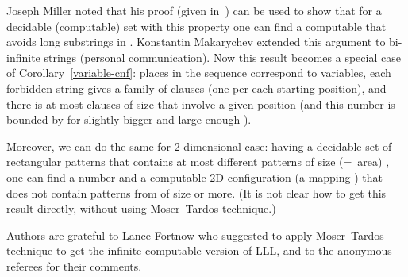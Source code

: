 \documentclass[12pt]{article}
\begin{document}
Joseph Miller noted that his proof (given in~\cite{miller-two-notes}) can be used to show that for a decidable (computable) set  with this property one can find a computable  that avoids long substrings in . Konstantin Makarychev extended this argument to bi-infinite strings (personal communication). Now this result becomes a special case of Corollary~\ref{variable-cnf}: places in the sequence correspond to variables, each forbidden string gives a family of clauses (one per each starting position), and there is at most  clauses of size  that involve a given position (and this number is bounded by  for slightly bigger  and large enough ).

Moreover, we can do the same for 2-dimensional case: having a decidable
set  of rectangular patterns that contains at most  different
patterns of size (=~area) , one can find a number  and a computable 2D configuration (a mapping ) that does not contain patterns from  of size  or more. (It is not clear how to get this result directly, without using Moser--Tardos technique.)

Authors are grateful to Lance Fortnow who suggested to apply Moser--Tardos
technique to get the infinite computable version of LLL, and to the anonymous referees for their comments.
\end{document}
